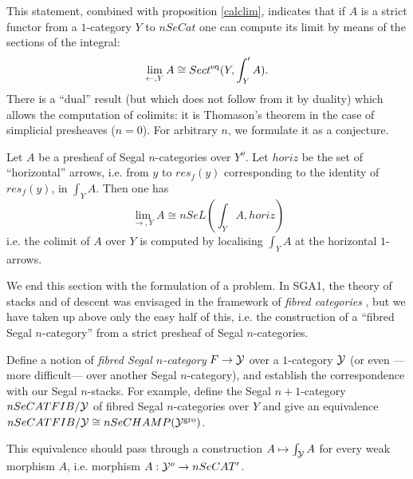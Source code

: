 This statement, combined with proposition \ref{calclim},
indicates
that if $A$ is a strict functor from a $1$-category $Y$ to $nSeCat$
one can compute its limit by means of the sections of the integral:
$$
\lim _{\leftarrow , Y}A \cong Sect ^{\rm eq}(Y, \int '_YA).
$$
There is a ``dual'' result (but which does not follow from it by duality)
which allows the computation of colimits: it is Thomason's theorem
\cite{ThomasonLimits}
in the case of simplicial presheaves ($n=0$). For arbitrary $n$,
we formulate it as a conjecture.


\begin{conjecture}
Let $A$ be a presheaf of Segal $n$-categories over $Y^o$.
Let $horiz$ be the set of ``horizontal'' arrows, i.e. from $y$ to
$res_f(y)$
corresponding to the identity of $res_f(y)$, in $\int _YA$. Then
one has
$$
\lim _{\rightarrow , Y} A \cong nSeL(\int _YA, horiz )
$$
i.e. the colimit of $A$ over $Y$ is computed by localising $\int _YA$ at the
horizontal $1$-arrows.
\end{conjecture}


We end this section with the formulation of a problem. In
SGA1, the theory of stacks and of descent was envisaged in the
framework
of {\em fibred categories} \cite{SGA1} \cite{GiraudThese}, but we
have taken up above only the easy half of this, i.e. the construction
of a ``fibred Segal $n$-category'' from a strict presheaf
of Segal $n$-categories.

\begin{problem}
\label{problemefibree}
Define a notion of {\em fibred Segal $n$-category}
$F\rightarrow {\cal Y}$ over a $1$-category ${\cal Y}$ (or even ---more
difficult--- over another Segal $n$-category), and establish
the correspondence with our Segal $n$-stacks. For example, define the
Segal $n+1$-category $nSeCATFIB /{\cal Y} $ of fibred Segal
$n$-categories over $Y$ and give an equivalence $nSeCATFIB
/{\cal Y} \cong nSeCHAMP ({\cal Y} ^{\rm gro})$.

This equivalence should pass through
a construction $A\mapsto \int _{{\cal Y}} A$ for every weak morphism $A$, i.e.
morphism $A: {\cal Y} ^o\rightarrow nSeCAT'$.
\end{problem}

